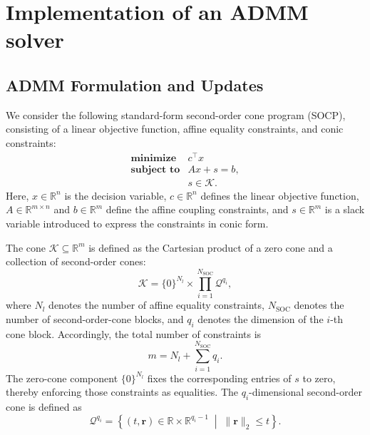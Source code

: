 
\section{Implementation of an ADMM solver}


\subsection{ADMM Formulation and Updates}

We consider the following standard-form second-order cone program (SOCP), consisting of a linear objective function, affine equality constraints, and conic constraints:
%
\begin{equation}
\begin{array}{ll}
\textbf{minimize}   & c^\top x \\
\textbf{subject to} & Ax + s = b, \\
                    & s \in \mathcal{K}.
\end{array}
\label{eq:cvxproblem}
\end{equation}
%
Here, \(x \in \mathbb{R}^{n}\) is the decision variable, \(c \in \mathbb{R}^{n}\) defines the linear objective function, \(A \in \mathbb{R}^{m\times n}\) and \(b \in \mathbb{R}^{m}\) define the affine coupling constraints, and \(s \in \mathbb{R}^{m}\) is a slack variable introduced to express the constraints in conic form.

The cone \(\mathcal{K}\subseteq\mathbb{R}^{m}\) is defined as the Cartesian product of a zero cone and a collection of second-order cones:
%
\begin{equation}
\mathcal{K}
=
\{0\}^{N_l}
\times
\prod_{i=1}^{N_{\mathrm{SOC}}}
\mathcal{Q}^{q_i},
\label{eq:coneK}
\end{equation}
%
where \(N_l\) denotes the number of affine equality constraints, \(N_{\mathrm{SOC}}\) denotes the number of second-order-cone blocks, and \(q_i\) denotes the dimension of the \(i\)-th cone block. Accordingly, the total number of constraints is
%
\begin{equation}
m
=
N_l
+
\sum_{i=1}^{N_{\mathrm{SOC}}} q_i.
\label{eq:Kdef}
\end{equation}
%
The zero-cone component \(\{0\}^{N_l}\) fixes the corresponding entries of \(s\) to zero, thereby enforcing those constraints as equalities. The \(q_i\)-dimensional second-order cone is defined as
%
\begin{equation}
\mathcal{Q}^{q_i}
=
\left\{
(t,\boldsymbol{r})\in\mathbb{R}\times\mathbb{R}^{q_i-1}
\;\middle|\;
\|\boldsymbol{r}\|_2 \leq t
\right\}.
\label{socDef}
\end{equation}

